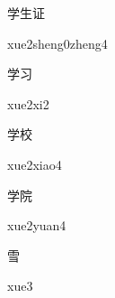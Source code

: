 \begin{verbete}{学生证}
\begin{pronuncia}{xue2sheng0zheng4}
\end{pronuncia}
\end{verbete}

\begin{verbete}[xue2xi2]{学习}
\begin{pronuncia}{xue2xi2}
\end{pronuncia}
\end{verbete}

\begin{verbete}{学校}
\begin{pronuncia}{xue2xiao4}
\end{pronuncia}
\end{verbete}

\begin{verbete}{学院}
\begin{pronuncia}{xue2yuan4}
\end{pronuncia}
\end{verbete}

\begin{verbete}[xue3]{雪}
\begin{pronuncia}{xue3}
\end{pronuncia}
\end{verbete}

